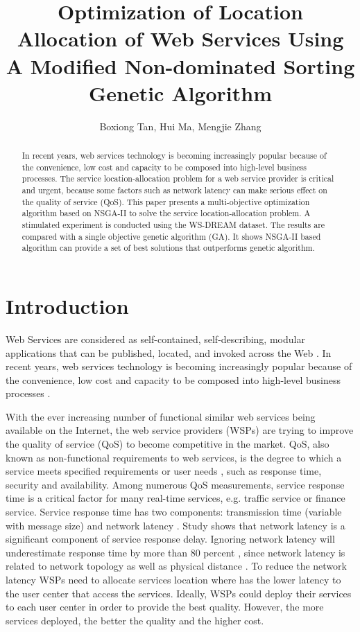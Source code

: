 \documentclass{llncs}
\title{
Optimization of Location Allocation of Web Services Using A Modified Non-dominated Sorting Genetic Algorithm
}
\author{Boxiong Tan, Hui Ma, Mengjie Zhang}
\institute{School of Engineering and Computer Science,
\\Victoria University of Wellington, New Zealand \\
\email{\{Boxiong.Tan, Hui.Ma, Mengjie.Zhang\}@ecs.vuw.ac.nz}}
\begin{document}
\maketitle

\begin{abstract}
In recent years, web services technology is becoming increasingly popular because of the convenience, 
low cost and capacity to be composed into high-level business processes. 
The service location-allocation problem for a web service provider is critical and urgent,
because some factors such as network latency can make serious effect on the quality of service (QoS). 
This paper presents a multi-objective optimization algorithm based on NSGA-II to solve the service location-allocation problem. 
A stimulated experiment is conducted using the WS-DREAM dataset. 
The results are compared with a single objective genetic algorithm (GA). 
It shows NSGA-II based algorithm can provide a set of best solutions that outperforms genetic algorithm.
\end{abstract}

\section{Introduction}
Web Services are considered as self-contained, self-describing, modular applications that can be published, located, and invoked across the Web \cite{Ran}. 
In recent years, web services technology is becoming increasingly popular because of the convenience, low cost and capacity to be composed into high-level business processes \cite{Aboolian}.

With the ever increasing number of functional similar web services being available on the Internet, the web service providers (WSPs) are trying to improve the quality of service (QoS) to become competitive in the market.  
QoS, also known as non-functional requirements to  web services, is the degree to which a service meets specified requirements or user needs \cite{4061431}, such as response time, security and availability. 
Among numerous QoS measurements, service response time is a critical factor for many real-time services, e.g. traffic service or finance service. 
Service response time has two components: transmission time (variable with message size) and network latency \cite{Johansson}. 
Study \cite{916684} shows that network latency is a significant component of service response delay.
Ignoring network latency will underestimate response time by more than 80 percent \cite{Sun}, since network latency is related to network topology as well as physical distance \cite{distanceMetrics}. 
To reduce the network latency WSPs need to allocate services location where has the lower latency to the user center that
access the services. Ideally, WSPs could deploy their services to each user center in order to provide the best quality.
However, the more services deployed, the better the quality and the higher cost. 
\end{document}

